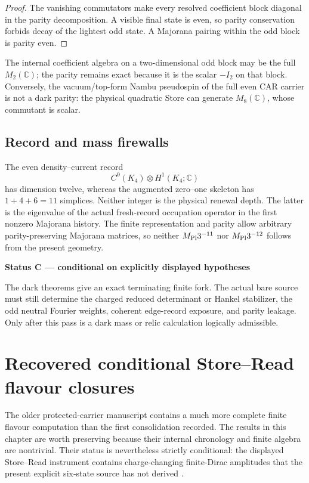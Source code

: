 \documentclass[11pt,oneside,openany]{book}
\numberwithin{equation}{chapter}
\theoremstyle{definition}
\theoremstyle{remark}
\newcommand{\C}{\mathbb C}
\newenvironment{statusbox}[2]{%
  \par\medskip\noindent
  \begin{center}\begin{minipage}{0.94\textwidth}
  \colorbox{#1!8}{\parbox{\dimexpr\linewidth-2\fboxsep\relax}{\textbf{#2}}}\par\smallskip
}{%
  \end{minipage}\end{center}\medskip
}
\newcommand{\Conditional}[1]{\begin{statusbox}{CondColor}{Status C --- conditional on explicitly displayed hypotheses}#1\end{statusbox}}
\begin{document}
\begin{proof}
The vanishing commutators make every resolved coefficient block diagonal in
the parity decomposition.  A visible final state is even, so parity
conservation forbids decay of the lightest odd state.  A Majorana pairing
within the odd block is parity even.
\end{proof}

The internal coefficient algebra on a two-dimensional odd block may be the
full \(M_2(\C)\); the parity remains exact because it is the scalar
\(-I_2\) on that block.  Conversely, the vacuum/top-form Nambu pseudospin of
the full even CAR carrier is not a dark parity: the physical quadratic Store
can generate \(M_8(\C)\), whose commutant is scalar.

\section{Record and mass firewalls}
The even density--current record
\[
 C^0(K_4)\otimes H^1(K_4;\C)
\]
has dimension twelve, whereas the augmented zero--one skeleton has
\(1+4+6=11\) simplices.  Neither integer is the physical renewal depth.  The
latter is the eigenvalue of the actual fresh-record occupation operator in
the first nonzero Majorana history.  The finite representation and parity
allow arbitrary parity-preserving Majorana matrices, so neither
\(M_{\rm Pl}3^{-11}\) nor \(M_{\rm Pl}3^{-12}\) follows from the present
geometry.

\Conditional{The dark theorems give an exact terminating finite fork.  The
actual bare source must still determine the charged reduced determinant or
Hankel stabilizer, the odd neutral Fourier weights, coherent edge-record
exposure, and parity leakage.  Only after this pass is a dark mass or relic
calculation logically admissible.}
\chapter{Recovered conditional Store--Read flavour closures}
\label{ch:conditional-store-read}

The older protected-carrier manuscript contains a much more complete finite
flavour computation than the first consolidation recorded.  The results in
this chapter are worth preserving because their internal chronology and
finite algebra are nontrivial.  Their status is nevertheless strictly
conditional: the displayed Store--Read instrument contains charge-changing
finite-Dirac amplitudes that the present explicit six-state source has not
derived \cite{PelissierProtectedK4,PelissierArchiveV244}.
\end{document}
